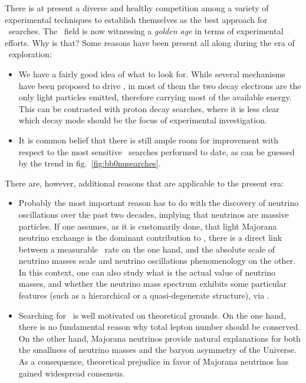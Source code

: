 There is at present a diverse and healthy competition among a variety of experimental techniques to establish themselves as the best approach for \bbonu\ searches. The \bbonu\ field is now witnessing a \emph{golden age} in terms of experimental efforts. Why is that? Some reasons have been present all along during the era of \bbonu\ exploration:
%
\begin{itemize}
%
\item We have a fairly good idea of what to look for. While several mechanisms have been proposed to drive \bbonu, in most of them the two decay electrons are the only light particles emitted, therefore carrying most of the available energy. This can be contrasted with proton decay searches, where it is less clear which decay mode should be the focus of experimental investigation.
%
\item It is common belief that there is still ample room for improvement with respect to the most sensitive \bbonu\ searches performed to date, as can be guessed by the trend in fig.~\ref{fig:bb0nusearches}.
\end{itemize}
%
There are, however, additional reasons that are applicable to the present era: 
\begin{itemize}
\item Probably the most important reason has to do with the discovery of neutrino oscillations over the past two decades, implying that neutrinos are massive particles. If one assumes, as it is customarily done, that light Majorana neutrino exchange is the dominant contribution to \bbonu, there is a direct link between a measurable \bbonu\ rate on the one hand, and the absolute scale of neutrino masses scale and neutrino oscillations phenomenology on the other. In this context, one can also study what is the actual value of neutrino masses, and whether the neutrino mass spectrum exhibits some particular features (such as a hierarchical or a quasi-degenerate structure), via \bbonu. 
%
\item Searching for \bbonu\ is well motivated on theoretical grounds. On the one hand, there is no fundamental reason why total lepton number should be conserved. On the other hand, Majorana neutrinos provide natural explanations for both the smallness of neutrino masses and the baryon asymmetry of the Universe. As a consequence, theoretical prejudice in favor of Majorana neutrinos has gained widespread consensus. 
%
\end{itemize}

